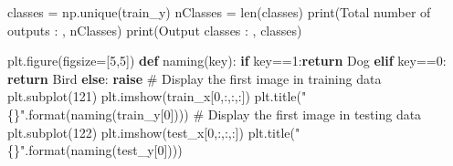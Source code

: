 \documentclass[
  letterpaper,
  DIV=11,
  numbers=noendperiod]{scrartcl}
\newenvironment{Shaded}{\begin{snugshade}}{\end{snugshade}}
\newcommand{\BuiltInTok}[1]{\textcolor[rgb]{0.00,0.23,0.31}{#1}}
\newcommand{\CommentTok}[1]{\textcolor[rgb]{0.37,0.37,0.37}{#1}}
\newcommand{\ControlFlowTok}[1]{\textcolor[rgb]{0.00,0.23,0.31}{\textbf{#1}}}
\newcommand{\DecValTok}[1]{\textcolor[rgb]{0.68,0.00,0.00}{#1}}
\newcommand{\KeywordTok}[1]{\textcolor[rgb]{0.00,0.23,0.31}{\textbf{#1}}}
\newcommand{\NormalTok}[1]{\textcolor[rgb]{0.00,0.23,0.31}{#1}}
\newcommand{\OperatorTok}[1]{\textcolor[rgb]{0.37,0.37,0.37}{#1}}
\newcommand{\SpecialCharTok}[1]{\textcolor[rgb]{0.37,0.37,0.37}{#1}}
\newcommand{\StringTok}[1]{\textcolor[rgb]{0.13,0.47,0.30}{#1}}
\begin{document}
\begin{Shaded}
\begin{Highlighting}[]
\NormalTok{classes }\OperatorTok{=}\NormalTok{ np.unique(train\_y)}
\NormalTok{nClasses }\OperatorTok{=} \BuiltInTok{len}\NormalTok{(classes)}
\BuiltInTok{print}\NormalTok{(}\StringTok{\textquotesingle{}Total number of outputs : \textquotesingle{}}\NormalTok{, nClasses)}
\BuiltInTok{print}\NormalTok{(}\StringTok{\textquotesingle{}Output classes : \textquotesingle{}}\NormalTok{, classes)}
\end{Highlighting}
\end{Shaded}

\begin{Shaded}
\begin{Highlighting}[]
\NormalTok{plt.figure(figsize}\OperatorTok{=}\NormalTok{[}\DecValTok{5}\NormalTok{,}\DecValTok{5}\NormalTok{])}
\KeywordTok{def}\NormalTok{ naming(key):}
    \ControlFlowTok{if}\NormalTok{ key}\OperatorTok{==}\DecValTok{1}\NormalTok{:}\ControlFlowTok{return} \StringTok{\textquotesingle{}Dog\textquotesingle{}}
    \ControlFlowTok{elif}\NormalTok{ key}\OperatorTok{==}\DecValTok{0}\NormalTok{: }\ControlFlowTok{return} \StringTok{\textquotesingle{}Bird\textquotesingle{}}
    \ControlFlowTok{else}\NormalTok{: }\ControlFlowTok{raise}
\CommentTok{\# Display the first image in training data}
\NormalTok{plt.subplot(}\DecValTok{121}\NormalTok{)}
\NormalTok{plt.imshow(train\_x[}\DecValTok{0}\NormalTok{,:,:,:])}
\NormalTok{plt.title(}\StringTok{"}\SpecialCharTok{\{\}}\StringTok{"}\NormalTok{.}\BuiltInTok{format}\NormalTok{(naming(train\_y[}\DecValTok{0}\NormalTok{])))}
\CommentTok{\# Display the first image in testing data}
\NormalTok{plt.subplot(}\DecValTok{122}\NormalTok{)}
\NormalTok{plt.imshow(test\_x[}\DecValTok{0}\NormalTok{,:,:,:])}
\NormalTok{plt.title(}\StringTok{"}\SpecialCharTok{\{\}}\StringTok{"}\NormalTok{.}\BuiltInTok{format}\NormalTok{(naming(test\_y[}\DecValTok{0}\NormalTok{])))}
\end{Highlighting}
\end{Shaded}
\end{document}
